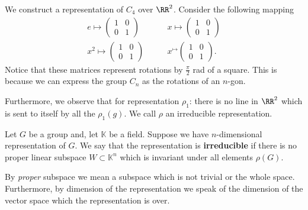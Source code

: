 \documentclass[12pt, a4paper]{article}
\newcommand{\KK}{\mathbb{K}}
\begin{document}
\begin{example}
    We construct a representation of \(C_4\) over \(\RR^2\). Consider the following mapping
    \[\begin{aligned}
        e \mapsto \begin{pmatrix} 1 & 0 \\ 0 & 1\end{pmatrix} &\qquad x \mapsto \begin{pmatrix} 1 & 0 \\ 0 & 1\end{pmatrix}\\
        x^2 \mapsto \begin{pmatrix} 1 & 0 \\ 0 & 1\end{pmatrix} &\qquad x^ \mapsto \begin{pmatrix} 1 & 0 \\ 0 & 1\end{pmatrix}.
    \end{aligned}\]
    Notice that these matrices represent rotations by \(\frac{\pi}{2}\) rad of a square. This is because we can express the group \(C_n\) as the rotations of an \(n\)-gon.

    \noindent Furthermore, we observe that for representation \(\rho_1\): there is no line in \(\RR^2\) which is sent to itself by all the \(\rho_1(g)\). We call \(\rho\) an irreducible representation.
\end{example}

\begin{definition}
    Let \(G\) be a group and, let \(\KK\) be a field. Suppose we have \(n\)-dimensional representation of \(G\). We say that the representation is \textbf{irreducible} if there is no proper linear subspace \(W \subset \KK^n\) which is invariant under all elements \(\rho(G)\).
\end{definition}

\begin{mdremark}
    By \textit{proper} subspace we mean a subspace which is not trivial or the whole space. Furthermore, by dimension of the representation we speak of the dimension of the vector space which the representation is over.
\end{mdremark}
\end{document}
